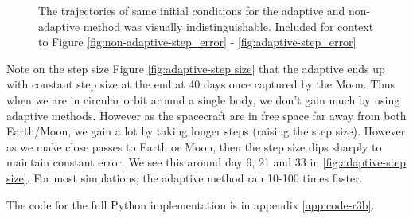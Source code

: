 \begin{figure}
{        }
        \caption{The trajectories of same initial conditions for the adaptive and non-adaptive method was visually indistinguishable. Included for context to Figure \ref{fig:non-adaptive-step_error} - \ref{fig:adaptive-step_error}}
        \label{fig:adaptive-xy_XY}
\end{figure}


Note on the step size Figure \ref{fig:adaptive-step size} that the adaptive ends up with constant step size at the end at 40 days once captured by the Moon. Thus when we are in circular orbit around a single body, we don't gain much by using adaptive methods. However as the spacecraft are in free space far away from both Earth/Moon, we gain a lot by taking longer steps (raising the step size). However as we make close passes to Earth or Moon, then the step size dips sharply to maintain constant error. We see this around day 9, 21 and 33 in \ref{fig:adaptive-step size}. For most simulations, the adaptive method ran 10-100 times faster.

The code for the full Python implementation is in appendix \ref{app:code-r3b}.
